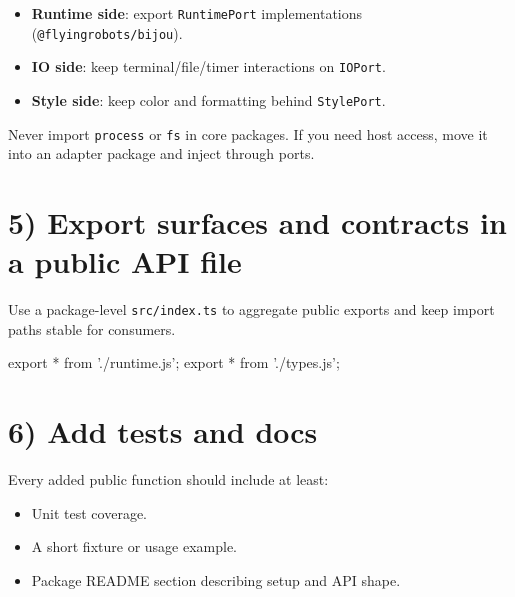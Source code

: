 \begin{itemize}
\tightlist
\item
  \textbf{Runtime side}: export \texttt{R\allowbreak{}u\allowbreak{}n\allowbreak{}t\allowbreak{}i\allowbreak{}m\allowbreak{}e\allowbreak{}P\allowbreak{}o\allowbreak{}r\allowbreak{}t} implementations (\texttt{@\allowbreak{}f\allowbreak{}l\allowbreak{}y\allowbreak{}i\allowbreak{}n\allowbreak{}g\allowbreak{}r\allowbreak{}o\allowbreak{}b\allowbreak{}o\allowbreak{}t\allowbreak{}s\allowbreak{}/\allowbreak{}b\allowbreak{}i\allowbreak{}j\allowbreak{}o\allowbreak{}u}).
\item
  \textbf{IO side}: keep terminal/file/timer interactions on \texttt{I\allowbreak{}O\allowbreak{}P\allowbreak{}o\allowbreak{}r\allowbreak{}t}.
\item
  \textbf{Style side}: keep color and formatting behind \texttt{S\allowbreak{}t\allowbreak{}y\allowbreak{}l\allowbreak{}e\allowbreak{}P\allowbreak{}o\allowbreak{}r\allowbreak{}t}.
\end{itemize}

Never import \texttt{p\allowbreak{}r\allowbreak{}o\allowbreak{}c\allowbreak{}e\allowbreak{}s\allowbreak{}s} or \texttt{f\allowbreak{}s} in core packages. If you need host access, move it into an adapter package and inject through ports.

\section{5) Export surfaces and contracts in a public API file}\label{record-011-export-surfaces-and-contracts-in-a-public-api-file}

Use a package-level \texttt{s\allowbreak{}r\allowbreak{}c\allowbreak{}/\allowbreak{}i\allowbreak{}n\allowbreak{}d\allowbreak{}e\allowbreak{}x\allowbreak{}.\allowbreak{}t\allowbreak{}s} to aggregate public exports and keep import paths stable for consumers.

\begin{CodeBlock}
export * from './runtime.js';
export * from './types.js';
\end{CodeBlock}

\section{6) Add tests and docs}\label{record-011-add-tests-and-docs}

Every added public function should include at least:

\begin{itemize}
\tightlist
\item
  Unit test coverage.
\item
  A short fixture or usage example.
\item
  Package README section describing setup and API shape.
\end{itemize}

